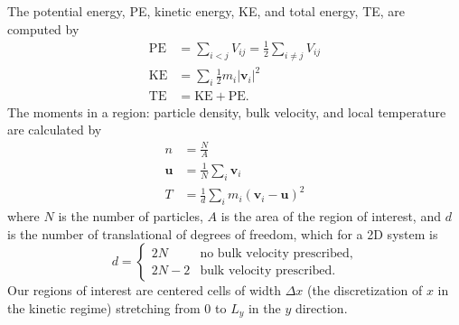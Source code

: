 \documentclass{article}
\begin{document}
The potential energy, PE, kinetic energy, KE, and total energy, TE, are computed by
\begin{align*}
\text{PE} &= \sum_{i<j}V_{ij} = \frac{1}{2}\sum_{i\neq j}V_{ij} \\
\text{KE}	&= \sum_{i}\frac{1}{2}m_i|\mathbf{v}_i|^2 \\
\text{TE}		&= \text{KE} + \text{PE}.
\end{align*}
The moments in a region: particle density, bulk velocity, and local temperature are calculated by
\begin{align*}
n &= \frac{N}{A} \\
\mathbf{u} &= \frac{1}{N}\sum_{i}\mathbf{v}_i \\
T &= \frac{1}{d}\sum_{i}m_i(\mathbf{v}_i-\mathbf{u})^2
\end{align*}
where $N$ is the number of particles, $A$ is the area of the region of interest, and $d$ is the number of translational of degrees of freedom, which for a 2D system is
\begin{equation*}
d = \begin{cases}
	2N& 	\text{no bulk velocity prescribed}, \\
	2N-2&	\text{bulk velocity prescribed.}
\end{cases}
\end{equation*}
Our regions of interest are centered cells of width $\Delta x$ (the discretization of $x$ in the kinetic regime) stretching from $0$ to $L_y$ in the $y$ direction.
\end{document}
